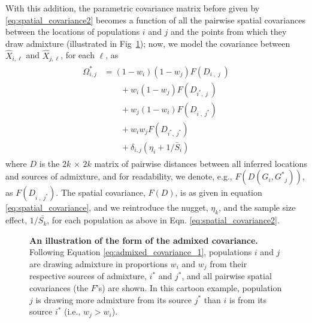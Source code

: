 \documentclass[10pt,letterpaper]{article}
\newcommand{\identifyadmixsource}[1]{{#1^{*}}}
\begin{document}
With this addition, the parametric covariance matrix before given by \eqref{eq:spatial_covariance2}
becomes a function of all the pairwise spatial covariances between the locations of populations $i$ and $j$ and the points from which they draw admixture 
(illustrated in Fig\ \ref{sfig:admixed_cov_diagram});
now, we model the covariance between $\hat X_{i,\ell}$ and $\hat X_{j,\ell}$, for each $\ell$, as
\begin{align}
\label{eq:admixed_covariance_1}\begin{split}
\identifyadmixsource{\Omega_{i,j}} 
    &= 
  (1-w_i)(1-w_j) F(D_{i\;,\;j\;}) \\
  &\qquad {} + w_i(1-w_j) F(D_{\identifyadmixsource{i},\;j\;})    \\
  &\qquad {} + w_j(1-w_i) F(D_{i\;,\;\identifyadmixsource{j}})    \\
  &\qquad {} + w_i w_j F(D_{\identifyadmixsource{i},\;\identifyadmixsource{j}})    \\
  &\qquad {} + \delta_{i,j} (\eta_i + 1 / \bar{S}_i) 
\end{split}
\end{align}
where $D$ is the $2k \, \times \, 2k$ matrix of pairwise distances between all inferred locations and sources of admixture, 
and for readability, we denote, e.g., $F(D(G_i,\identifyadmixsource{G}_j))$, as $F(D_{i\;,\;\identifyadmixsource{j}})$.
The spatial covariance, $F(D)$, is as given in equation \eqref{eq:spatial_covariance}, and we reintroduce the nugget, $\eta_k$, and the sample size effect, $1/\bar{S_k}$, for each population as above in Eqn. \eqref{eq:spatial_covariance2}.
%
\begin{figure}[ht!]
\begin{center}
\end{center}
\caption{
\textbf{An illustration of the form of the admixed covariance.}
Following Equation \eqref{eq:admixed_covariance_1}, populations $i$ and $j$ are drawing admixture in proportions $w_i$ and $w_j$ from their respective sources of admixture, $\identifyadmixsource{i}$ and $\identifyadmixsource{j}$, and all pairwise spatial covariances (the $F$'s) are shown.  In this cartoon example, population $j$ is drawing more admixture from its source $\identifyadmixsource{j}$ than $i$ is from its source $\identifyadmixsource{i}$ (i.e., $w_j > w_i$).
}\label{sfig:admixed_cov_diagram}
\end{figure}
\end{document}
